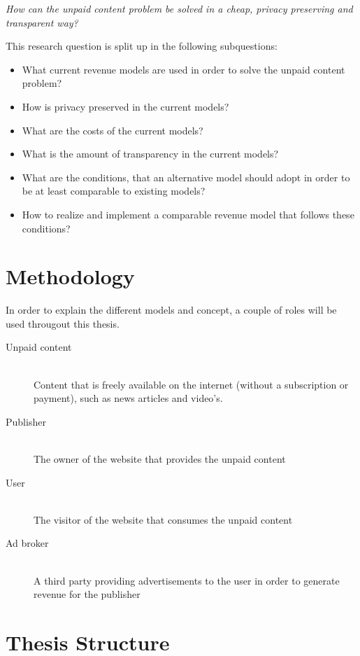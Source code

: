 \textit{How can the unpaid content problem be solved in a cheap, privacy preserving and transparent way?}
\vspace{1em}

\noindent This research question is split up in the following subquestions:

\begin{itemize}
  \item What current revenue models are used in order to solve the unpaid content problem?
  \item How is privacy preserved in the current models?
  \item What are the costs of the current models?
  \item What is the amount of transparency in the current models?
  \item What are the conditions, that an alternative model should adopt in order to be at least comparable to existing models?
  \item How to realize and implement a comparable revenue model that follows these conditions?
\end{itemize}

\section{Methodology}
In order to explain the different models and concept, a couple of roles will be used througout this thesis.

\begin{description}
  \item[Unpaid content] \hfill \\ Content that is freely available on the internet (without a subscription or payment), such as news articles and video's.
  \item[Publisher] \hfill \\ The owner of the website that provides the unpaid content
  \item[User] \hfill \\ The visitor of the website that consumes the unpaid content
  \item[Ad broker] \hfill \\ A third party providing advertisements to the user in order to generate revenue for the publisher
\end{description}

\section{Thesis Structure}